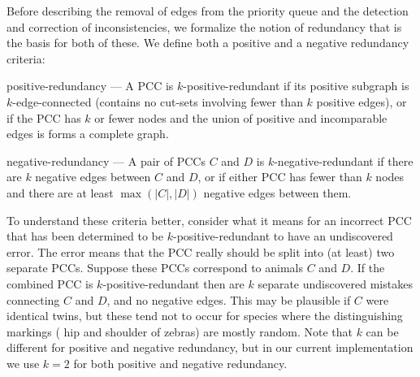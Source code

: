 Before describing the removal of edges from the priority queue and the detection and correction of inconsistencies,
we formalize the notion of redundancy that is the basis for both of these.
We define both a positive and a negative redundancy criteria: \begin{enumln}

    \item positive-redundancy --- %
        A PCC is $k$-positive-redundant if its positive subgraph is $k$-edge-connected (contains no cut-sets
        involving fewer than $k$ positive edges\cite{eswaran_augmentation_1976}), or if the PCC has $k$ or fewer
        nodes and the union of positive and incomparable edges is forms a complete graph.

    \item negative-redundancy --- %
        A pair of PCCs $C$ and $D$ is $k$-negative-redundant if there are $k$ negative edges between $C$ and $D$,
        or if either PCC has fewer than $k$ nodes and there are at least $\mathop{max}(|C|, |D|)$ negative edges
        between them.
        

\end{enumln}
To understand these criteria better, consider what it means for an incorrect PCC that has been determined to be
$k$-positive-redundant to have an undiscovered error. The error means that the PCC really should be split into (at
least) two separate PCCs. Suppose these PCCs correspond to animals $C$ and $D$. If the combined PCC is
$k$-positive-redundant then are $k$ separate undiscovered mistakes connecting $C$ and $D$, and no negative edges.
This may be plausible if $C$ were identical twins, but these tend not to occur for species where the distinguishing
markings (\eg{} hip and shoulder of zebras) are mostly random. Note that $k$ can be different for positive and
negative redundancy, but in our current implementation we use $k=2$ for both positive and negative redundancy.

